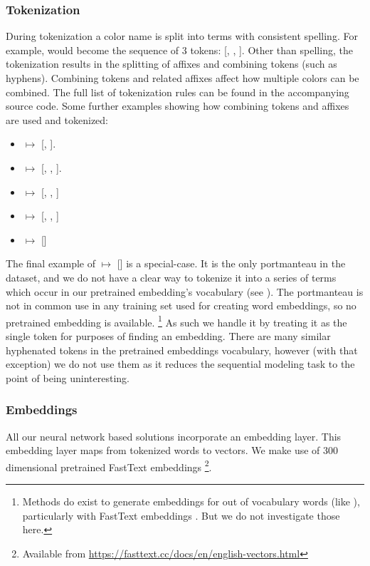 \subsubsection{Tokenization}
During tokenization a color name is split into terms with consistent spelling.
For example,  would become the sequence of 3 tokens: [, , ].
Other than spelling, the tokenization results in the splitting of affixes and combining tokens (such as hyphens).
Combining tokens and related affixes affect how multiple colors can be combined.
The full list of tokenization rules can be found in the accompanying source code.
Some further examples showing how combining tokens and affixes are used and tokenized:
\begin{itemize}
	\item {} $\mapsto$ [, ].
	\item {} $\mapsto$ [, \natlang{-}, ].
	\item {} $\mapsto$ [, , ]
	\item {} $\mapsto$ [, , ]
	\item {} $\mapsto$ []
\end{itemize}
The final example of  $\mapsto$ [] is a special-case.
It is the only portmanteau in the dataset, and we do not have a clear way to tokenize it into a series of terms which occur in our pretrained embedding's vocabulary (see ).
The portmanteau  is not in common use in any training set used for creating word embeddings, so no pretrained embedding is available.%
\footnote{Methods do exist to generate embeddings for out of vocabulary words (like ), particularly with FastText embeddings \parencite{bojanowski2016enriching}. But we do not investigate those here.}
As such we handle it by treating it as the single token  for purposes of finding an embedding.
There are many similar hyphenated tokens in the pretrained embeddings vocabulary, however (with that exception) we do not use them as it reduces the sequential modeling task to the point of being uninteresting.




\subsubsection{Embeddings}\label{sec:embeddings} 
All our neural network based solutions incorporate an embedding layer.
This embedding layer maps from tokenized words to vectors.
We make use of 300 dimensional pretrained FastText embeddings \parencite{bojanowski2016enriching}\footnote{Available from \url{https://fasttext.cc/docs/en/english-vectors.html}}.

